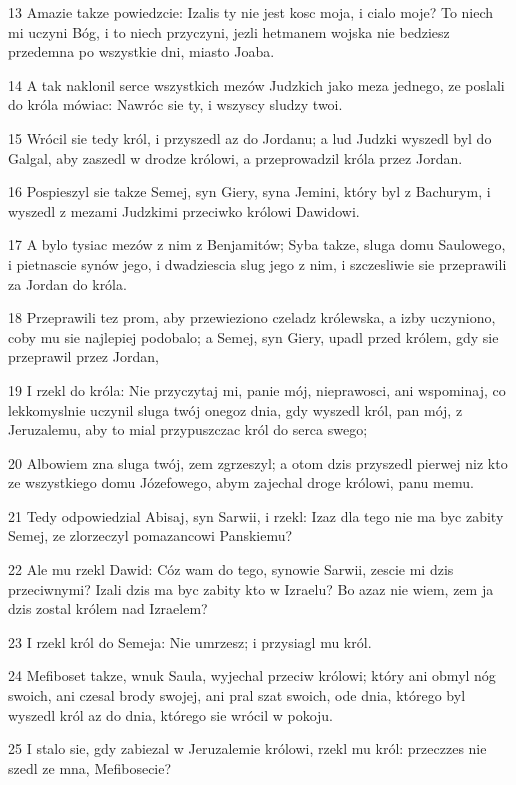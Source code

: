 \par 13 Amazie takze powiedzcie: Izalis ty nie jest kosc moja, i cialo moje? To niech mi uczyni Bóg, i to niech przyczyni, jezli hetmanem wojska nie bedziesz przedemna po wszystkie dni, miasto Joaba.
\par 14 A tak naklonil serce wszystkich mezów Judzkich jako meza jednego, ze poslali do króla mówiac: Nawróc sie ty, i wszyscy sludzy twoi.
\par 15 Wrócil sie tedy król, i przyszedl az do Jordanu; a lud Judzki wyszedl byl do Galgal, aby zaszedl w drodze królowi, a przeprowadzil króla przez Jordan.
\par 16 Pospieszyl sie takze Semej, syn Giery, syna Jemini, który byl z Bachurym, i wyszedl z mezami Judzkimi przeciwko królowi Dawidowi.
\par 17 A bylo tysiac mezów z nim z Benjamitów; Syba takze, sluga domu Saulowego, i pietnascie synów jego, i dwadziescia slug jego z nim, i szczesliwie sie przeprawili za Jordan do króla.
\par 18 Przeprawili tez prom, aby przewieziono czeladz królewska, a izby uczyniono, coby mu sie najlepiej podobalo; a Semej, syn Giery, upadl przed królem, gdy sie przeprawil przez Jordan,
\par 19 I rzekl do króla: Nie przyczytaj mi, panie mój, nieprawosci, ani wspominaj, co lekkomyslnie uczynil sluga twój onegoz dnia, gdy wyszedl król, pan mój, z Jeruzalemu, aby to mial przypuszczac król do serca swego;
\par 20 Albowiem zna sluga twój, zem zgrzeszyl; a otom dzis przyszedl pierwej niz kto ze wszystkiego domu Józefowego, abym zajechal droge królowi, panu memu.
\par 21 Tedy odpowiedzial Abisaj, syn Sarwii, i rzekl: Izaz dla tego nie ma byc zabity Semej, ze zlorzeczyl pomazancowi Panskiemu?
\par 22 Ale mu rzekl Dawid: Cóz wam do tego, synowie Sarwii, zescie mi dzis przeciwnymi? Izali dzis ma byc zabity kto w Izraelu? Bo azaz nie wiem, zem ja dzis zostal królem nad Izraelem?
\par 23 I rzekl król do Semeja: Nie umrzesz; i przysiagl mu król.
\par 24 Mefiboset takze, wnuk Saula, wyjechal przeciw królowi; który ani obmyl nóg swoich, ani czesal brody swojej, ani pral szat swoich, ode dnia, którego byl wyszedl król az do dnia, którego sie wrócil w pokoju.
\par 25 I stalo sie, gdy zabiezal w Jeruzalemie królowi, rzekl mu król: przeczzes nie szedl ze mna, Mefibosecie?
